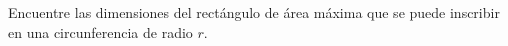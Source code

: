 \item Encuentre las dimensiones del rectángulo de área máxima que se puede inscribir en una circunferencia de radio $r$.
